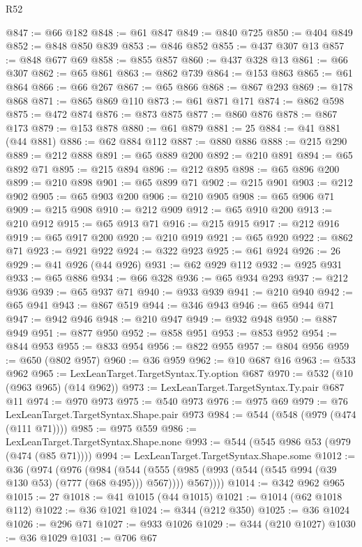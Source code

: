 \begin{lexlean}{R52}
\begin{coremodule}
@847 := @66 @182
@848 := @61 @847
@849 := @840 @725
@850 := @404 @849
@852 := @848 @850 @839
@853 := @846 @852
@855 := @437 @307 @13
@857 := @848 @677 @69
@858 := @855 @857
@860 := @437 @328 @13
@861 := @66 @307
@862 := @65 @861
@863 := @862 @739
@864 := @153 @863
@865 := @61 @864
@866 := @66 @267
@867 := @65 @866
@868 := @867 @293
@869 := @178 @868
@871 := @865 @869 @110
@873 := @61 @871 @171
@874 := @862 @598
@875 := @472 @874
@876 := @873 @875
@877 := @860 @876
@878 := @867 @173
@879 := @153 @878
@880 := @61 @879
@881 := 25
@884 := @41 @881 (@44 @881)
@886 := @62 @884 @112
@887 := @880 @886
@888 := @215 @290
@889 := @212 @888
@891 := @65 @889 @200
@892 := @210 @891
@894 := @65 @892 @71
@895 := @215 @894
@896 := @212 @895
@898 := @65 @896 @200
@899 := @210 @898
@901 := @65 @899 @71
@902 := @215 @901
@903 := @212 @902
@905 := @65 @903 @200
@906 := @210 @905
@908 := @65 @906 @71
@909 := @215 @908
@910 := @212 @909
@912 := @65 @910 @200
@913 := @210 @912
@915 := @65 @913 @71
@916 := @215 @915
@917 := @212 @916
@919 := @65 @917 @200
@920 := @210 @919
@921 := @65 @920
@922 := @862 @71
@923 := @921 @922
@924 := @322 @923
@925 := @61 @924
@926 := 26
@929 := @41 @926 (@44 @926)
@931 := @62 @929 @112
@932 := @925 @931
@933 := @65 @886
@934 := @66 @328
@936 := @65 @934 @293
@937 := @212 @936
@939 := @65 @937 @71
@940 := @933 @939
@941 := @210 @940
@942 := @65 @941
@943 := @867 @519
@944 := @346 @943
@946 := @65 @944 @71
@947 := @942 @946
@948 := @210 @947
@949 := @932 @948
@950 := @887 @949
@951 := @877 @950
@952 := @858 @951
@953 := @853 @952
@954 := @844 @953
@955 := @833 @954
@956 := @822 @955
@957 := @804 @956
@959 := @650 (@802 @957)
@960 := @36 @959
@962 := @10 @687 @16
@963 := @533 @962
@965 := LexLeanTarget.TargetSyntax.Ty.option @687
@970 := @532 (@10 (@963 @965) (@14 @962))
@973 := LexLeanTarget.TargetSyntax.Ty.pair @687 @11
@974 := @970 @973
@975 := @540 @973
@976 := @975 @69
@979 := @76 LexLeanTarget.TargetSyntax.Shape.pair @973
@984 := @544 (@548 (@979 (@474 (@111 @71))))
@985 := @975 @559
@986 := LexLeanTarget.TargetSyntax.Shape.none
@993 := @544 (@545 @986 @53 (@979 (@474 (@85 @71))))
@994 := LexLeanTarget.TargetSyntax.Shape.some
@1012 := @36
    (@974
      (@976
        (@984
          (@544
            (@555 (@985 (@993 (@544 (@545 @994 (@39 @130 @53) (@777 (@68 @495))) @567))))
            @567))))
@1014 := @342 @962 @965
@1015 := 27
@1018 := @41 @1015 (@44 @1015)
@1021 := @1014 (@62 @1018 @112)
@1022 := @36 @1021
@1024 := @344 (@212 @350)
@1025 := @36 @1024
@1026 := @296 @71
@1027 := @933 @1026
@1029 := @344 (@210 @1027)
@1030 := @36 @1029
@1031 := @706 @67

\end{coremodule}
\end{lexlean}
